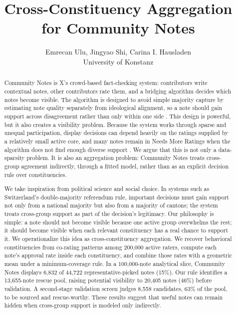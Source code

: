 \documentclass[10pt,twocolumn]{article}
\title{\textbf{Cross-Constituency Aggregation for Community Notes}}
\author{
Emrecan Ulu, Jingyao Shi, Carina I. Hausladen\\
University of Konstanz
}
\date{}
\begin{document}
\maketitle

\begin{abstract}
Community Notes is X's crowd-based fact-checking system: contributors write
contextual notes, other contributors rate them, and a bridging algorithm decides
which notes become visible. The algorithm is designed to avoid simple majority
capture by estimating note quality separately from ideological alignment, so a
note should gain support across disagreement rather than only within one side
\citep{wojcik2022birdwatch,xcommunitynotes2026ranking}. This design is powerful,
but it also creates a visibility problem. Because the system works through
sparse and unequal participation, display decisions can depend heavily on the
ratings supplied by a relatively small active core, and many notes remain in
Needs More Ratings when the algorithm does not find enough diverse support
\citep{goyal2026qsmf,razuvayevskaya2025timeliness}. We argue that this is not
only a data-sparsity problem. It is also an aggregation problem: Community Notes
treats cross-group agreement indirectly, through a fitted model, rather than as
an explicit decision rule over constituencies.

We take inspiration from political science and social choice. In systems such
as Switzerland's double-majority referendum rule, important decisions must gain
support not only from a national majority but also from a majority of cantons;
the system treats cross-group support as part of the decision's legitimacy. Our
philosophy is simple: a note should not become visible because one active group
overwhelms the rest; it should become visible when each relevant constituency
has a real chance to support it. We operationalize this idea as
cross-constituency aggregation. We recover behavioral constituencies from
co-rating patterns among 200,000 active raters, compute each note's approval
rate inside each constituency, and combine those rates with a geometric mean
under a minimum-coverage rule. In a 100,000-note analytical slice, Community
Notes displays 6,832 of 44,722 representative-picked notes (15\%). Our rule
identifies a 13,655-note rescue pool, raising potential visibility to 20,405
notes (46\%) before validation. A second-stage validation screen judges 8,558
candidates, 63\% of the pool, to be sourced and rescue-worthy. These results suggest
that useful notes can remain hidden when cross-group support is modeled only
indirectly.
\end{abstract}
\end{document}
